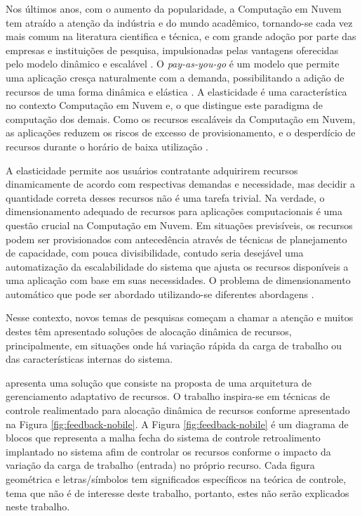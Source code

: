 Nos últimos anos, com o aumento da popularidade, a Computação em Nuvem tem atraído a atenção da indústria e do mundo acadêmico, tornando-se cada vez mais comum na literatura cientifica e técnica, e com grande adoção por parte das empresas e instituições de pesquisa, impulsionadas pelas vantagens oferecidas pelo modelo dinâmico e escalável . O \textit{pay-as-you-go} é um modelo que permite uma aplicação cresça naturalmente com a demanda, possibilitando a adição de recursos de uma forma dinâmica e elástica \cite{vazquez2014}. 
A elasticidade é uma característica no contexto Computação em Nuvem e, o que distingue este paradigma de computação dos demais. Como os recursos escaláveis da Computação em Nuvem, as aplicações reduzem os riscos de excesso de provisionamento, e o desperdício de recursos durante o horário de baixa utilização \cite{vazquez2014, galante2012}.

A elasticidade permite aos usuários contratante adquirirem recursos dinamicamente de acordo com respectivas demandas e necessidade, mas decidir a quantidade correta desses recursos não é uma tarefa trivial. Na verdade, o dimensionamento adequado de recursos para aplicações computacionais é uma questão crucial na Computação em Nuvem. Em situações previsíveis, os recursos podem ser provisionados com antecedência através de técnicas de planejamento de capacidade, com pouca divisibilidade, contudo seria desejável uma automatização da escalabilidade do sistema que ajusta os recursos disponíveis a uma aplicação com base em suas necessidades. O problema de dimensionamento automático que pode ser abordado utilizando-se diferentes abordagens \cite{Tania2012}.  

Nesse contexto, novos temas de pesquisas começam a chamar a atenção e muitos destes têm apresentado soluções de alocação dinâmica de recursos, principalmente, em situações onde há variação rápida da carga de trabalho ou das características internas do sistema. 

 apresenta uma solução que consiste na proposta de uma arquitetura de gerenciamento adaptativo de recursos. O trabalho inspira-se em técnicas de controle realimentado para alocação dinâmica de recursos conforme apresentado na Figura \ref{fig:feedback-nobile}. A Figura \ref{fig:feedback-nobile} é um diagrama de blocos que representa a malha fecha do sistema de controle retroalimento implantado no sistema afim de controlar os recursos conforme o impacto da variação da carga de trabalho (entrada) no próprio recurso. Cada figura geométrica e letras/símbolos tem significados específicos na teórica de controle, tema que não é de interesse deste trabalho, portanto, estes não serão explicados neste trabalho.

